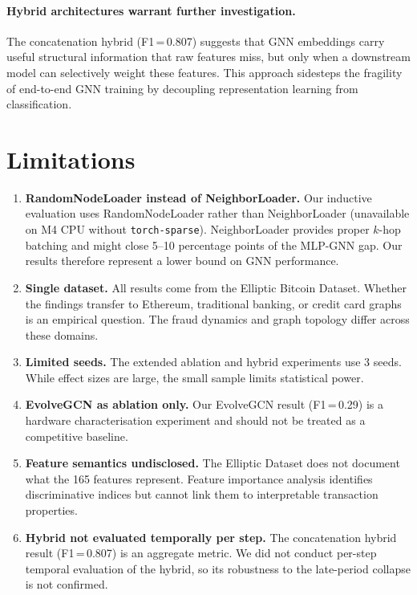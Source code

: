 \paragraph{Hybrid architectures warrant further investigation.}
The concatenation hybrid (F1\,=\,0.807) suggests that GNN embeddings
carry useful structural information that raw features miss, but only
when a downstream model can selectively weight these features.  This
approach sidesteps the fragility of end-to-end GNN training by
decoupling representation learning from classification.


\section{Limitations}
\label{sec:limitations}

\begin{enumerate}[leftmargin=*]
  \item \textbf{RandomNodeLoader instead of NeighborLoader.}
    Our inductive evaluation uses RandomNodeLoader rather than
    NeighborLoader (unavailable on M4 CPU without
    \texttt{torch-sparse}).  NeighborLoader provides proper $k$-hop
    batching and might close 5--10 percentage points of the MLP-GNN
    gap.  Our results therefore represent a lower bound on GNN
    performance.

  \item \textbf{Single dataset.}  All results come from the Elliptic
    Bitcoin Dataset.  Whether the findings transfer to Ethereum,
    traditional banking, or credit card graphs is an empirical question.
    The fraud dynamics and graph topology differ across these domains.

  \item \textbf{Limited seeds.}  The extended ablation and hybrid
    experiments use 3 seeds.  While effect sizes are large, the small
    sample limits statistical power.

  \item \textbf{EvolveGCN as ablation only.}  Our EvolveGCN result
    (F1\,=\,0.29) is a hardware characterisation experiment and should
    not be treated as a competitive baseline.

  \item \textbf{Feature semantics undisclosed.}  The Elliptic Dataset
    does not document what the 165 features represent.  Feature
    importance analysis identifies discriminative indices but cannot
    link them to interpretable transaction properties.

  \item \textbf{Hybrid not evaluated temporally per step.}  The
    concatenation hybrid result (F1\,=\,0.807) is an aggregate metric.
    We did not conduct per-step temporal evaluation of the hybrid,
    so its robustness to the late-period collapse is not confirmed.
\end{enumerate}


